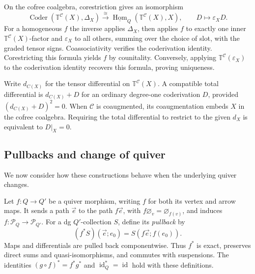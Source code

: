 \documentclass[11pt,letterpaper]{article}
\numberwithin{equation}{section}
\theoremstyle{plain}
\theoremstyle{definition}
\theoremstyle{remark}
\newcommand{\id}{\operatorname{id}}
\begin{document}
On the cofree coalgebra, corestriction gives an isomorphism
\begin{equation}\label{eq_Coder_Hom_Q}
 \operatorname{Coder}(\mathbb T^{\mathscr C}(X),\Delta_X)
 \xrightarrow{\ \cong\ }
 \underline{\operatorname{Hom}}_Q(\mathbb T^{\mathscr C}(X),X),
 \qquad D\longmapsto\varepsilon_XD.
\end{equation}
For a homogeneous $f$ the inverse applies $\Delta_X$, then applies $f$
to exactly one inner $\mathbb T^{\mathscr C}(X)$-factor and
$\varepsilon_X$ to all others, summing over the choice of slot, with
the graded tensor signs. Coassociativity verifies the coderivation
identity. Corestricting this formula yields $f$ by counitality.
Conversely, applying $\mathbb T^{\mathscr C}(\varepsilon_X)$ to the
coderivation identity recovers this formula, proving uniqueness.

Write $d_{C(X)}$ for the tensor differential on
$\mathbb T^{\mathscr C}(X)$. A compatible total differential is
$d_{C(X)}+D$ for an ordinary degree-one coderivation $D$, provided
$(d_{C(X)}+D)^2=0$. When $\mathscr C$ is coaugmented, its coaugmentation
embeds $X$ in the cofree coalgebra. Requiring the total differential
to restrict to the given $d_X$ is equivalent to $D|_X=0$.

\subsection{Pullbacks and change of quiver}
\label{ss_change_quiver}

We now consider how these constructions behave when the underlying quiver changes.

Let $f:Q\to Q'$ be a quiver morphism, writing $f$ for both its
vertex and arrow maps. It sends a path $\vec e$ to the path
$f\vec e$, with $f\varnothing_v=\varnothing_{f(v)}$, and induces
$f:\mathcal P_Q\to\mathcal P_{Q'}$.
For a dg $Q'$-collection $S$, define its \textit{pullback} by
\begin{equation}\label{eq_change_quiver_pullback}
 (f^*S)(\vec e;e_0)=S(f\vec e;f(e_0)).
\end{equation}
Maps and differentials are pulled back componentwise. Thus $f^*$ is
exact, preserves direct sums and quasi-isomorphisms, and commutes with
suspensions. The identities $(g\circ f)^*=f^*g^*$ and
$\id_Q^*=\id$ hold with these definitions.
\end{document}
